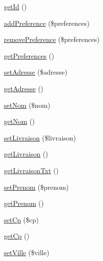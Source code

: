 \begin{DoxyCompactItemize}
\item 
\hyperlink{class_acme_group_1_1_user_bundle_1_1_entity_1_1_user_a971f1605b17ee4bc2c05f386e94d3663}{get\+Id} ()
\item 
\hyperlink{class_acme_group_1_1_user_bundle_1_1_entity_1_1_user_ab3e0eb6f4262316e37dfb2f184440f1c}{add\+Preference} (\$preferences)
\item 
\hyperlink{class_acme_group_1_1_user_bundle_1_1_entity_1_1_user_a52e4a126440500ef1e6df6d8087bf076}{remove\+Preference} (\$preferences)
\item 
\hyperlink{class_acme_group_1_1_user_bundle_1_1_entity_1_1_user_a51aed773dc48a19c103c0a5250be6554}{get\+Preferences} ()
\item 
\hyperlink{class_acme_group_1_1_user_bundle_1_1_entity_1_1_user_ae11aeb8636ef5fa7ef8236bec7bc814c}{set\+Adresse} (\$adresse)
\item 
\hyperlink{class_acme_group_1_1_user_bundle_1_1_entity_1_1_user_aecb2c14318db3c821b56c85438d86334}{get\+Adresse} ()
\item 
\hyperlink{class_acme_group_1_1_user_bundle_1_1_entity_1_1_user_a0854271e4bd00acce5d8f8730dec7a49}{set\+Nom} (\$nom)
\item 
\hyperlink{class_acme_group_1_1_user_bundle_1_1_entity_1_1_user_a3a2344964eb0eaca7f47e0281e231380}{get\+Nom} ()
\item 
\hyperlink{class_acme_group_1_1_user_bundle_1_1_entity_1_1_user_a437206831ffe6ed6bb254b8e3cf4213a}{set\+Livraison} (\$livraison)
\item 
\hyperlink{class_acme_group_1_1_user_bundle_1_1_entity_1_1_user_aba651778822b1ae028f892a2824e8fe6}{get\+Livraison} ()
\item 
\hyperlink{class_acme_group_1_1_user_bundle_1_1_entity_1_1_user_a15fba42cec9074cc4e0583802a3b791f}{get\+Livraison\+Txt} ()
\item 
\hyperlink{class_acme_group_1_1_user_bundle_1_1_entity_1_1_user_a4460b3a492d32758fe12a1c05f4f1e55}{set\+Prenom} (\$prenom)
\item 
\hyperlink{class_acme_group_1_1_user_bundle_1_1_entity_1_1_user_ae0b8cc3773d42eeeace86179146f5964}{get\+Prenom} ()
\item 
\hyperlink{class_acme_group_1_1_user_bundle_1_1_entity_1_1_user_a146977b6de6ec9c9338fcffb3e0bb20b}{set\+Cp} (\$cp)
\item 
\hyperlink{class_acme_group_1_1_user_bundle_1_1_entity_1_1_user_a1a81b4a7a79fecd6bacf23c455266781}{get\+Cp} ()
\item 
\hyperlink{class_acme_group_1_1_user_bundle_1_1_entity_1_1_user_af7b07a2b9da0500202d28ad0ff953383}{set\+Ville} (\$ville)

\end{DoxyCompactItemize}
